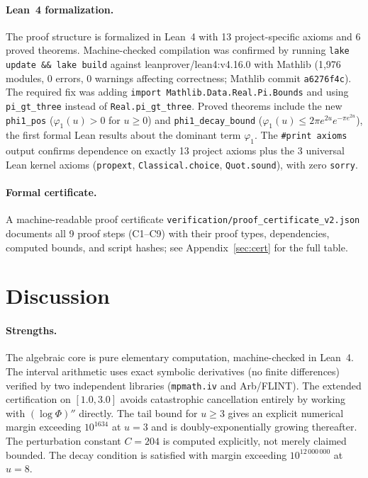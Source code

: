 \documentclass[11pt]{article}
\theoremstyle{definition}
\theoremstyle{remark}
\begin{document}
\paragraph{Lean~4 formalization.} The proof structure is formalized in Lean~4 with 13 project-specific axioms and 6 proved theorems. Machine-checked compilation was confirmed by running \texttt{lake update \&\& lake build} against leanprover/lean4:v4.16.0 with Mathlib (1{,}976 modules, 0 errors, 0 warnings affecting correctness; Mathlib commit \texttt{a6276f4c}). The required fix was adding \texttt{import Mathlib.Data.Real.Pi.Bounds} and using \texttt{pi\_gt\_three} instead of \texttt{Real.pi\_gt\_three}. Proved theorems include the new \texttt{phi1\_pos} ($\varphi_1(u)>0$ for $u\geq 0$) and \texttt{phi1\_decay\_bound} ($\varphi_1(u) \leq 2\pi e^{2u}e^{-\pi e^{2u}}$), the first formal Lean results about the dominant term $\varphi_1$. The \texttt{\#print axioms} output confirms dependence on exactly 13 project axioms plus the 3 universal Lean kernel axioms (\texttt{propext}, \texttt{Classical.choice}, \texttt{Quot.sound}), with zero \texttt{sorry}.

\paragraph{Formal certificate.} A machine-readable proof certificate \texttt{verification/proof\_certificate\_v2.json} documents all 9 proof steps (C1--C9) with their proof types, dependencies, computed bounds, and script hashes; see Appendix~\ref{sec:cert} for the full table.

\section{Discussion}
\label{sec:discussion}

\paragraph{Strengths.} The algebraic core is pure elementary computation, machine-checked in Lean~4. The interval arithmetic uses exact symbolic derivatives (no finite differences) verified by two independent libraries (\texttt{mpmath.iv} and Arb/FLINT). The extended certification on $[1.0, 3.0]$ avoids catastrophic cancellation entirely by working with $(\log\Phi)''$ directly. The tail bound for $u \geq 3$ gives an explicit numerical margin exceeding $10^{1634}$ at $u = 3$ and is doubly-exponentially growing thereafter. The perturbation constant $C = 204$ is computed explicitly, not merely claimed bounded. The decay condition is satisfied with margin exceeding $10^{12\,000\,000}$ at~$u = 8$.
\end{document}
